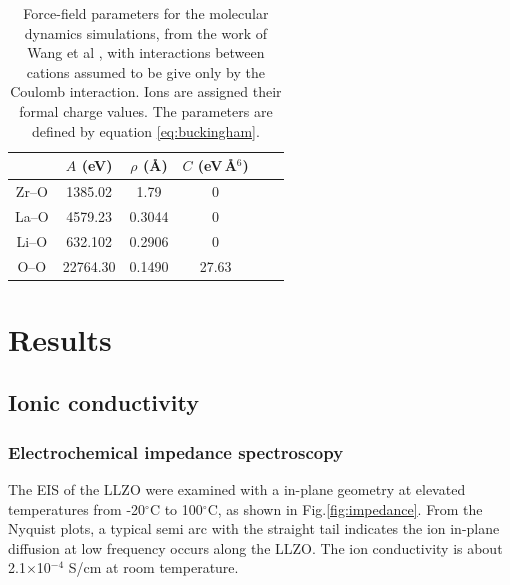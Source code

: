 \documentclass[twoside,twocolumn,9pt]{article}
\begin{document}
\begin{table}[t]
\centering
\caption{Force-field parameters for the molecular dynamics simulations, from the work of Wang et al \cite{Wang:2014ic}, with interactions between cations assumed to be give only by the Coulomb interaction. Ions are assigned their formal charge values. The parameters are defined by equation \ref{eq:buckingham}.} \label{tab:md_force}
\begin{tabular}{cccccc}
\hline
      & $A$ (eV)  & $\rho$ (\AA) & $C$ (eV\,\AA$^6$)           \\
\hline
Zr--O  & 1385.02 & 1.79        & 0                      \\
La--O  & 4579.23 & 0.3044      & 0                      \\
Li--O  & 632.102 & 0.2906      & 0                      \\
O--O   & 22764.30& 0.1490      & 27.63                  \\
\hline
\end{tabular}
\end{table}





%


\section{Results}

\subsection{Ionic conductivity}

\subsubsection{Electrochemical impedance spectroscopy}

The EIS of the LLZO were examined with a in-plane geometry at elevated temperatures from -20$^\circ$C to 100$^\circ$C, as shown in  Fig.\ref{fig:impedance}.
From the Nyquist plots, a typical semi arc with the straight tail indicates the ion in-plane diffusion at low frequency occurs along the LLZO.
The ion conductivity is about 2.1$\times$10$^{-4}$ S/cm at room temperature.
\end{document}
